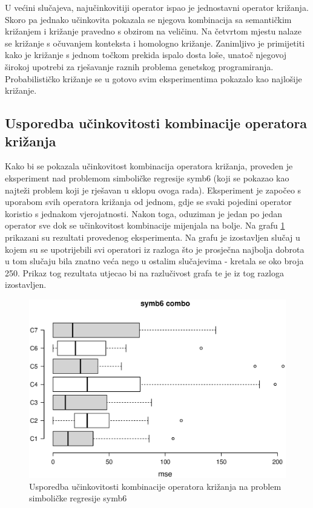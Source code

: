 U većini slučajeva, najučinkovitiji operator ispao je jednostavni operator križanja. Skoro pa jednako učinkovita pokazala se njegova kombinacija sa semantičkim križanjem i križanje pravedno s obzirom na veličinu. Na četvrtom mjestu nalaze se križanje s očuvanjem konteksta i homologno križanje. Zanimljivo je primijetiti kako je križanje s jednom točkom prekida ispalo dosta loše, unatoč njegovoj širokoj upotrebi za rješavanje raznih problema genetskog programiranja. Probabilističko križanje se u gotovo svim eksperimentima pokazalo kao najlošije križanje.

\subsection{Usporedba učinkovitosti kombinacije operatora križanja}

Kako bi se pokazala učinkovitost kombinacija operatora križanja, proveden je eksperiment nad problemom simboličke regresije symb6 (koji se pokazao kao najteži problem koji je rješavan u sklopu ovoga rada). Eksperiment je započeo s uporabom svih operatora križanja od jednom, gdje se svaki pojedini operator koristio s jednakom vjerojatnosti. Nakon toga, oduziman je jedan po jedan operator sve dok se učinkovitost kombinacije mijenjala na bolje. Na grafu \ref{symb6combo} prikazani su rezultati provedenog eksperimenta. Na grafu je izostavljen slučaj u kojem su se upotrijebili svi operatori iz razloga što je prosječna najbolja dobrota u tom slučaju bila znatno veća nego u ostalim slučajevima - kretala se oko broja 250. Prikaz tog rezultata utjecao bi na razlučivost grafa te je iz tog razloga izostavljen. 

\begin{figure}[H]
	\centering
	\includegraphics[trim=4cm 4cm 0cm 0cm, scale=0.6]{./slike/boxPlots/symb6-combo.eps}
	\caption{Usporedba učinkovitosti kombinacije operatora križanja na problem simboličke regresije symb6}
	\label{symb6combo}
\end{figure}

